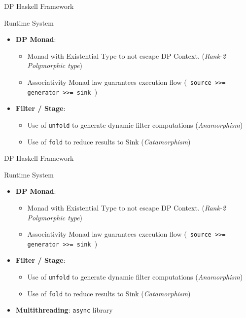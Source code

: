\begin{frame}[fragile]{DP Haskell Framework}
  \begin{block}{Runtime System}
    \begin{itemize}
      \item \textbf{DP Monad}:
      \begin{itemize} 
      \item Monad with Existential Type to not escape DP Context. (\textit{Rank-2 Polymorphic type})
      \item Associativity Monad law guarantees execution flow (\texttt{ source >>= generator >>= sink }) 
      \end{itemize}
      \item \textbf{Filter / Stage}: 
      \begin{itemize}
        \item Use of \texttt{unfold} to generate dynamic filter computations (\textit{Anamorphism})
        \item Use of \texttt{fold} to reduce results to Sink (\textit{Catamorphism})
      \end{itemize}
    \end{itemize}
  \end{block}
  \end{frame}

\begin{frame}[fragile]{DP Haskell Framework}
  \begin{block}{Runtime System}
    \begin{itemize}
      \item \textbf{DP Monad}:
      \begin{itemize} 
      \item Monad with Existential Type to not escape DP Context. (\textit{Rank-2 Polymorphic type})
      \item Associativity Monad law guarantees execution flow (\texttt{ source >>= generator >>= sink }) 
      \end{itemize}
      \item \textbf{Filter / Stage}: 
      \begin{itemize}
        \item Use of \texttt{unfold} to generate dynamic filter computations (\textit{Anamorphism})
        \item Use of \texttt{fold} to reduce results to Sink (\textit{Catamorphism})
      \end{itemize}
      \item \textbf{Multithreading}: \texttt{async} library
    \end{itemize}
  \end{block}
  \end{frame}

